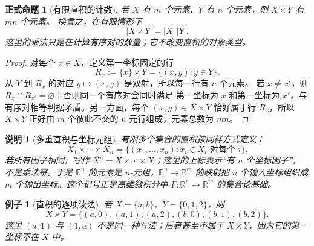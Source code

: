 \documentclass[UTF8,fontset=none,a4paper,11pt]{ctexart}
\theoremstyle{foundation-definition}
\theoremstyle{foundation-theorem}
\theoremstyle{foundation-proposition}
\newtheorem{proposition}[definition]{正式命题}
\theoremstyle{foundation-example}
\newtheorem{example}[definition]{例子}
\theoremstyle{foundation-remark}
\newtheorem{remark}[definition]{说明}
\theoremstyle{foundation-theorem}
\begin{document}
\begin{proposition}[有限直积的计数]
若 $X$ 有 $m$ 个元素、$Y$ 有 $n$ 个元素，则 $X\times Y$ 有 $mn$ 个元素。
换言之，在有限情形下
\[
  |X\times Y|=|X|\,|Y|.
\]
这里的乘法只是在计算有序对的数量；它不改变直积的对象类型。
\end{proposition}

\begin{proof}
对每个 $x\in X$，定义第一坐标固定的行
\[
  R_x:=\{x\}\times Y=\{(x,y):y\in Y\}.
\]
从 $Y$ 到 $R_x$ 的对应 $y\mapsto(x,y)$ 是双射，所以每一行有 $n$ 个元素。
若 $x\ne x'$，则 $R_x\cap R_{x'}=\varnothing$：否则同一个有序对会同时满足
第一坐标为 $x$ 和第一坐标为 $x'$，与有序对相等判据矛盾。另一方面，每个
$(x,y)\in X\times Y$ 恰好属于行 $R_x$，所以 $X\times Y$ 正好由 $m$ 个彼此不交的
$n$ 元行组成，元素总数为 $mn$。
\end{proof}

\begin{remark}[多重直积与坐标元组]
有限多个集合的直积按同样方式定义：
\[
X_1\times\cdots\times X_n
=\{(x_1,\ldots,x_n):x_i\in X_i\text{ 对每个 }i\}.
\]
若所有因子相同，写作 \(X^n=X\times\cdots\times X\)；这里的上标表示“有 \(n\) 个坐标因子”，
不是乘法幂。于是 \(\mathbb R^n\) 的元素是 \(n\)-元组，\(\mathbb R^n\to\mathbb R^m\)
的映射把 \(n\) 个输入坐标组织成 \(m\) 个输出坐标。这个记号正是高维微积分中
\(F:\mathbb R^n\to\mathbb R^m\) 的集合论基础。
\end{remark}

\begin{example}[直积的逐项读法]
若 \(X=\{a,b\}\)、\(Y=\{0,1,2\}\)，则
\[
X\times Y=\{(a,0),(a,1),(a,2),(b,0),(b,1),(b,2)\}.
\]
这里 \((a,1)\) 与 \((1,a)\) 不是同一种写法；后者甚至不属于
\(X\times Y\)，因为它的第一坐标不在 \(X\) 中。
\end{example}
\end{document}
